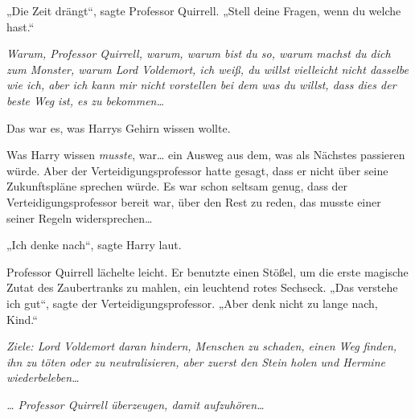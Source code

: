 „Die Zeit drängt“, sagte Professor Quirrell. „Stell deine Fragen, wenn du welche hast.“

\emph{Warum, Professor Quirrell, warum, warum bist du so, warum machst du dich zum Monster, warum Lord Voldemort, ich weiß, du willst vielleicht nicht dasselbe wie ich, aber ich kann mir nicht vorstellen bei dem was du willst, dass \emph{dies} der beste Weg ist, es zu bekommen…}

Das war es, was Harrys Gehirn wissen wollte.

Was Harry wissen \emph{musste}, war… ein Ausweg aus dem, was als Nächstes passieren würde. Aber der Verteidigungsprofessor hatte gesagt, dass er nicht über seine Zukunftspläne sprechen würde. Es war schon seltsam genug, dass der Verteidigungsprofessor bereit war, über den Rest zu reden, das musste einer seiner Regeln widersprechen…

„Ich denke nach“, sagte Harry laut.

Professor Quirrell lächelte leicht. Er benutzte einen Stößel, um die erste magische Zutat des Zaubertranks zu mahlen, ein leuchtend rotes Sechseck.
„Das verstehe ich gut“, sagte der Verteidigungsprofessor. „Aber denk nicht zu lange nach, Kind.“

\emph{Ziele: Lord Voldemort daran hindern, Menschen zu schaden, einen Weg finden, ihn zu töten oder zu neutralisieren, aber zuerst den Stein holen und Hermine wiederbeleben…}

\emph{… Professor Quirrell überzeugen, damit aufzuhören…}

